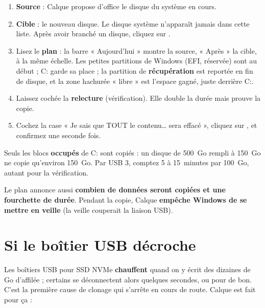 \begin{enumerate}
\item \textbf{Source} : Calque propose d'office le disque du système en cours.
\item \textbf{Cible} : le nouveau disque. Le disque système n'apparaît jamais dans cette liste. Après
      avoir branché un disque, cliquez sur .
\item Lisez le \textbf{plan} : la barre « Aujourd'hui » montre la source, « Après » la cible, à la
      même échelle. Les petites partitions de Windows (EFI, réservée) sont au début ; C: garde sa
      place ; la partition de \textbf{récupération} est reportée en fin de disque, et la zone hachurée
      « libre » est l'espace gagné, juste derrière C:.
\item Laissez cochée la \textbf{relecture} (vérification). Elle double la durée mais prouve la copie.
\item Cochez la case « Je sais que TOUT le contenu… sera effacé », cliquez sur , et
      confirmez une seconde fois.
\end{enumerate}


Seuls les blocs \textbf{occupés} de C: sont copiés : un disque de 500~Go rempli à 150~Go ne copie
qu'environ 150~Go. Par USB 3, comptez 5 à 15~minutes par 100~Go, autant pour la vérification.

Le plan annonce aussi \textbf{combien de données seront copiées et une fourchette de durée}.
Pendant la copie, Calque \textbf{empêche Windows de se mettre en veille} (la veille couperait la
liaison USB).


\section{Si le boîtier USB décroche}\label{sec:decroche}

Les boîtiers USB pour SSD NVMe \textbf{chauffent} quand on y écrit des dizaines de Go d'affilée ;
certains se déconnectent alors quelques secondes, ou pour de bon. C'est la première cause de
clonage qui s'arrête en cours de route. Calque est fait pour ça :

